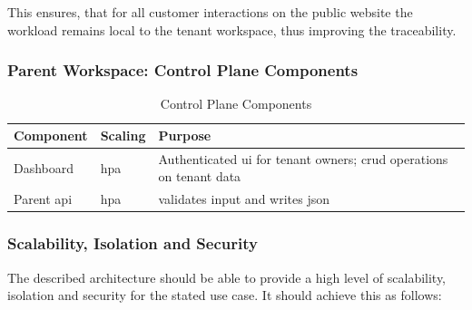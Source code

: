 \documentclass[11pt, a4paper, oneside, listof=totoc]{scrartcl}
\begin{document}
                This ensures, that for all customer interactions on the public website the workload
                remains local to the tenant workspace, thus improving the traceability.
            \subsubsection{Parent Workspace: Control Plane Components}\label{subsubsec:controlPlaneComponents}
                
                \begin{table}[H]\label{tab:parentComponents}
                    \centering
                    \renewcommand{\arraystretch}{1.5}
                    \begin{tabular}{lp{4cm}P{8cm}}
                        \toprule
                        Component & Scaling & Purpose \\
                        \midrule
                        Dashboard & \gls{hpa} & Authenticated \gls{ui} for tenant owners; \gls{crud} operations on tenant data \\
                        Parent \gls{api} & \gls{hpa} & validates input and writes \gls{json} \\
                        \bottomrule
                    \end{tabular}
                    \caption{Control Plane Components}
                \end{table}

            \subsubsection{Scalability, Isolation and Security}\label{scalabilityIsolationSecurity}
                The described architecture should be able to provide a high level of scalability,
                isolation and security for the stated use case.
                It should achieve this as follows:
\end{document}
